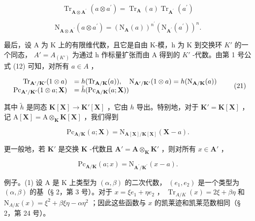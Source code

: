 \[
\operatorname{Tr} _ {\mathbf {A} \otimes \mathbf {A} ^ {\prime}} (a \otimes a ^ {\prime}) = \operatorname{Tr} _ {\mathbf {A}} (a) \operatorname{Tr} _ {\mathbf {A} ^ {\prime}} (a ^ {\prime})\tag{20}
\]

\[
\mathrm{N} _ {\mathbf {A} \otimes \mathbf {A} ^ {\prime}} (a \otimes a ^ {\prime}) = (\mathrm{N} _ {\mathbf {A}} (a)) ^ {n ^ {\prime}} (\mathrm{N} _ {\mathbf {A} ^ {\prime}} (a ^ {\prime})) ^ {n}.
\]

最后，设 A 为 K 上的有限维代数，且它是自由 K-模，h 为 K 到交换环 \(K'\) 的一个同态， \(A' = A_{(K')}\) 为通过 h 作标量扩张而由 A 得到的 \(K'\) -代数。由第 1 号公式 (12) 可知，对所有 \(a \in A\) ，

\[
\begin{array}{r l} \mathrm{Tr} _ {\mathbf {A} ^ {\prime} / \mathbf {K} ^ {\prime}} (1 \otimes a) & = h (\mathrm{Tr} _ {\mathbf {A} / \mathbf {K}} (a)), \quad \mathrm{N} _ {\mathbf {A} ^ {\prime} / \mathbf {K} ^ {\prime}} (1 \otimes a) = h (\mathrm{N} _ {\mathbf {A} / \mathbf {K}} (a)) \\ \mathrm{Pc} _ {\mathbf {A} ^ {\prime} / \mathbf {K} ^ {\prime}} (1 \otimes a; \mathbf {X}) & = \tilde {h} (\mathrm{Pc} _ {\mathbf {A} / \mathbf {K}} (a; \mathbf {X})) \end{array}\tag{21}
\]

其中 \(\tilde{h}\) 是同态 \(\mathbf{K}[\mathbf{X}] \to \mathbf{K}'[\mathbf{X}]\) ，它由 \(h\) 导出。特别地，对于 \(\mathbf{K}' = \mathbf{K}[\mathbf{X}]\) ，记 \(\mathrm{A}[\mathbf{X}] = \mathrm{A} \otimes_{\mathbf{K}} \mathbf{K}[\mathbf{X}]\) ，我们得到

\[
\mathrm{Pc} _ {\mathbf {A} / \mathbf {K}} (a; \mathbf {X}) = \mathrm{N} _ {\mathbf {A} [ \mathbf {X} ] / \mathbf {K} [ \mathbf {X} ]} (\mathbf {X} - a).\tag{22}
\]

更一般地，若 \(\mathbf{K}'\) 是交换 \(\mathbf{K}\) -代数且 \(\mathbf{A}' = \mathbf{A} \otimes_{\mathbf{K}} \mathbf{K}'\) ，则对所有 \(x \in \mathbf{A}'\) ，

\[
\mathrm{Pc} _ {\mathbf {A} / \mathbf {K}} (a; x) = \mathrm{N} _ {\mathbf {A} ^ {\prime} / \mathbf {K} ^ {\prime}} (x - a).
\]

例子。(1) 设 A 是 K 上类型为 \((\alpha, \beta)\) 的二次代数， \((e_1, e_2)\) 是一个类型为 \((\alpha, \beta)\) 的基（§ 2，第 3 号）。对于 \(x = \xi e_1 + \eta e_2\) ， \(\operatorname{Tr}_{A/K}(x) = 2\xi + \beta \eta\) 和 \(\mathrm{N}_{A/K}(x) = \xi^2 + \beta \xi \eta - \alpha \eta^2\) ；因此这些函数与 \(x\) 的凯莱迹和凯莱范数相同（§ 2，第 24 号）。

